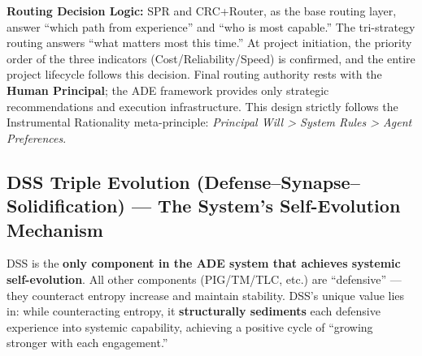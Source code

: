 \documentclass[11pt,a4paper]{article}
\begin{document}
\begin{center}
\end{center}

\textbf{Routing Decision Logic:} SPR and CRC+Router, as the base routing layer, answer ``which path from experience'' and ``who is most capable.'' The tri-strategy routing answers ``what matters most this time.'' At project initiation, the priority order of the three indicators (Cost/Reliability/Speed) is confirmed, and the entire project lifecycle follows this decision. Final routing authority rests with the \textbf{Human Principal}; the ADE framework provides only strategic recommendations and execution infrastructure. This design strictly follows the Instrumental Rationality meta-principle: \emph{Principal Will > System Rules > Agent Preferences}.

\subsection{DSS Triple Evolution (Defense--Synapse--Solidification) --- The System's Self-Evolution Mechanism}

DSS is the \textbf{only component in the ADE system that achieves systemic self-evolution}. All other components (PIG/TM/TLC, etc.) are ``defensive'' --- they counteract entropy increase and maintain stability. DSS's unique value lies in: while counteracting entropy, it \textbf{structurally sediments} each defensive experience into systemic capability, achieving a positive cycle of ``growing stronger with each engagement.''
\end{document}

